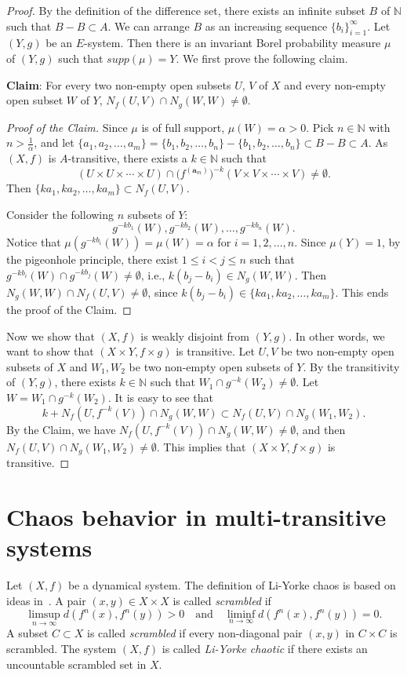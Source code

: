 \documentclass[12pt,a4paper]{amsart}
\theoremstyle{definition}
\numberwithin{equation}{section}
\begin{document}
\begin{proof}
By the definition of the difference set, there exists an infinite subset $B$ of $\mathbb{N}$ such that $B-B\subset A$.
We can arrange $B$ as an increasing sequence $\{b_i\}_{i=1}^\infty$.
Let $(Y, g)$ be an $E$-system.
Then there is an invariant Borel probability measure $\mu$ of $(Y,g)$ such that $supp(\mu)=Y$.
We first prove the following claim.

\textbf{Claim}: For every two non-empty open subsets
$U$, $V$ of $X$ and every non-empty open subset $W$ of $Y$, $N_f(U,V)\cap N_g(W,W)\neq\emptyset$.
\begin{proof}[Proof of the Claim]
Since $\mu$ is of full support, $\mu(W)=\alpha>0$.
Pick $n\in \mathbb{N}$ with $n>\frac{1}{\alpha}$,
and let $\{a_1,a_2,\dotsc, a_m\}=\{b_1,b_2,\dotsc,b_n\}-\{b_1,b_2,\dotsc,b_n\}\subset B-B\subset A$.
As $(X,f)$ is $A$-transitive,  there exists a $k\in\mathbb{N}$  such that
\[(U\times U\times\dotsb \times U)\cap
\bigl(f^{(\mathbf{a}_m)}\bigr)^{-k}(V\times V\times\dotsb\times V)\neq\emptyset.\]
Then $\{ka_1,ka_2,\dotsc,ka_m\}\subset N_f(U, V)$.

Consider the following $n$ subsets of $Y$:
\[g^{-kb_1}(W),  g^{-kb_2}(W),  \dotsc, g^{-kb_n}(W).\]
Notice that $\mu(g^{-kb_i}(W))=\mu(W)=\alpha$ for $i=1, 2, \dotsc, n$.
Since $\mu(Y)=1$, by the pigeonhole principle, there exist $1\leq i<j\leq n$  such that
$g^{-kb_i}(W)\cap g^{-kb_j}(W)\neq\emptyset$, i.e., $k(b_j-b_i)\in N_g(W, W)$.
Then $N_g(W, W)\cap N_f(U, V)\neq\emptyset$, since $k(b_j-b_i)\in \{ka_1,ka_2,\dotsc,ka_m\}$.
This ends the proof of the Claim.
\end{proof}
Now we show that $(X,f)$ is weakly disjoint from $(Y,g)$.
In other words, we want to show that $(X\times Y,f\times g)$ is transitive.
Let $U,V$ be two non-empty open subsets of $X$ and $W_1,W_2$ be two non-empty open subsets of $Y$.
By the transitivity of $(Y,g)$, there exists $k\in\mathbb{N}$ such that $W_1\cap g^{-k}(W_2)\neq\emptyset$.
Let $W=W_1\cap g^{-k}(W_2)$. It is easy to see that
\[k+N_f(U,f^{-k}(V))\cap N_g(W,W)\subset N_f(U,V)\cap N_g(W_1,W_2).\]
By the Claim, we have $N_f(U,f^{-k}(V))\cap N_g(W,W)\neq\emptyset$, and then
 $N_f(U,V)\cap N_g(W_1,W_2)\neq\emptyset$.
This implies that $(X\times Y,f\times g)$ is transitive.
\end{proof}

\section{Chaos behavior in multi-transitive systems}
Let $(X,f)$ be a dynamical system.
The definition of Li-Yorke chaos is based on ideas in~\cite{T-Li-J-Yorke-1975}.
A pair $(x, y)\in X\times X$ is called \emph{scrambled} if
\[\limsup_{n\to\infty}d(f^{n}(x), f^{n}(y))>0\quad\text{and}\quad
 \liminf_{n\rightarrow \infty}d(f^{n}(x), f^{n}(y))=0.\]
A subset $C\subset X$ is called \emph{scrambled}
if every non-diagonal pair $(x,y)$ in $C\times C$ is scrambled.
The system $(X,f)$ is called \emph{Li-Yorke chaotic}
if there exists an uncountable scrambled set in $X$.
\end{document}
